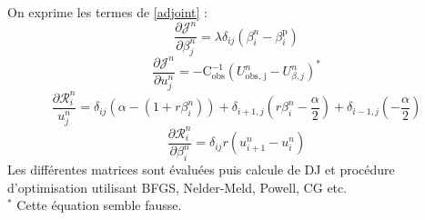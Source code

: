 \documentclass[a4paper,12pt]{article}
\newcommand{\bepar}[1]{
	\left( #1 \right)  
}
\newcommand\bk{\color{black}}
\newcommand\red{\color{red}}
\numberwithin{equation}{section} %
\begin{document}
\noindent  On exprime les termes de \eqref{adjoint} : 
\begin{equation}
\frac{\partial \mathcal{J}^n }{\partial \beta^n_j} = \lambda \delta_{ij} \bepar{\beta_i^n - \beta_i^{\text{p}}}
\end{equation}
\red
\begin{equation}
\frac{\partial \mathcal{J}^n}{\partial u_j^n} = -\text{C}_\text{obs}^{-1} \bepar{U^n_{\text{obs, j}} - U^n_{\beta, j}} ^*
\end{equation}
\bk
\begin{equation}
\frac{\partial \mathcal{R}^n_i }{u_j^n} = \delta_{ij}\bepar{\alpha -\bepar{1 + r \beta_i^n}} + \delta_{i+1, j} \bepar{r \beta^n_i - \frac{\alpha}{2}} + \delta_{i-1, j} \bepar{-\frac{\alpha}{2}} 
\end{equation}
\begin{equation}
\frac{\partial \mathcal{R}_i^n}{\partial \beta_i^n} = \delta_{ij} r \bepar{u^n_{i+1} - u^n_i}
\end{equation}
Les différentes matrices sont évaluées puis calcule de DJ et procédure d'optimisation utilisant BFGS, Nelder-Meld, Powell, CG etc.\\
\red $^*$ Cette équation semble fausse.
\bk
\pagebreak
\end{document}
